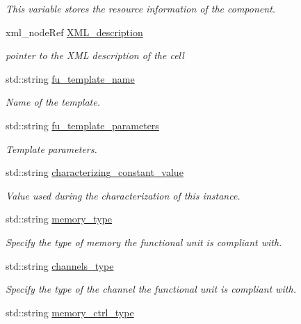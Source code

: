 \begin{DoxyCompactItemize}
\begin{DoxyCompactList}\small\item\em This variable stores the resource information of the component. \end{DoxyCompactList}\item 
xml\+\_\+node\+Ref \hyperlink{structfunctional__unit_a5b8bbf88b9922ed54eeb7782c283b498}{X\+M\+L\+\_\+description}
\begin{DoxyCompactList}\small\item\em pointer to the X\+ML description of the cell \end{DoxyCompactList}\item 
std\+::string \hyperlink{structfunctional__unit_ac969b29e6e1db285793d37ef56f38119}{fu\+\_\+template\+\_\+name}
\begin{DoxyCompactList}\small\item\em Name of the template. \end{DoxyCompactList}\item 
std\+::string \hyperlink{structfunctional__unit_aa44cc9ed9f004fef4c2b23eda1543e96}{fu\+\_\+template\+\_\+parameters}
\begin{DoxyCompactList}\small\item\em Template parameters. \end{DoxyCompactList}\item 
std\+::string \hyperlink{structfunctional__unit_acc3396c5f54360855fce38a9139b13d7}{characterizing\+\_\+constant\+\_\+value}
\begin{DoxyCompactList}\small\item\em Value used during the characterization of this instance. \end{DoxyCompactList}\item 
std\+::string \hyperlink{structfunctional__unit_a9a31e3517578bf183d48e6a341676392}{memory\+\_\+type}
\begin{DoxyCompactList}\small\item\em Specify the type of memory the functional unit is compliant with. \end{DoxyCompactList}\item 
std\+::string \hyperlink{structfunctional__unit_a0c197e94ca77221ec1ce2b657ffd816a}{channels\+\_\+type}
\begin{DoxyCompactList}\small\item\em Specify the type of the channel the functional unit is compliant with. \end{DoxyCompactList}\item 
std\+::string \hyperlink{structfunctional__unit_aa76dd27e7dc1c9f5a210e3ee31192447}{memory\+\_\+ctrl\+\_\+type}

\end{DoxyCompactItemize}
